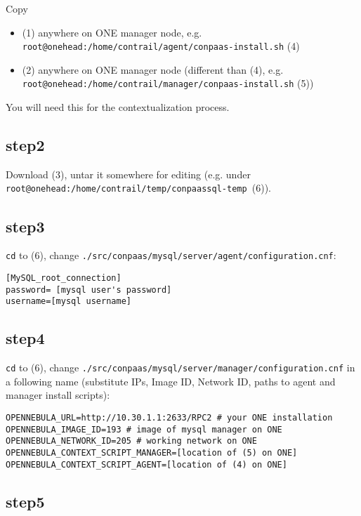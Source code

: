 \documentclass[a4paper,10pt]{article}
\begin{document}
Copy
\begin{itemize}
\item (1) anywhere on ONE manager node, e.g. \\ {\tt root@onehead:/home/contrail/agent/conpaas-install.sh} (4)
\item (2) anywhere on ONE manager node (different than (4), e.g. \\ {\tt root@onehead:/home/contrail/manager/conpaas-install.sh} (5))
\end{itemize}

You will need this for the contextualization process.

\subsection*{step2} 

Download (3), untar it somewhere for editing (e.g. under \\ {\tt root@onehead:/home/contrail/temp/conpaassql-temp }(6)).

\subsection*{step3}

{\tt cd} to (6), change {\tt ./src/conpaas/mysql/server/agent/configuration.cnf}:

\begin{Verbatim}[frame=single]
[MySQL_root_connection]
password= [mysql user's password]
username=[mysql username]
\end{Verbatim}

\subsection*{step4}

{\tt cd} to (6), change {\tt ./src/conpaas/mysql/server/manager/configuration.cnf} in a following name (substitute IPs, Image ID, Network ID, paths to agent and manager install scripts):

\begin{Verbatim}[frame=single]
OPENNEBULA_URL=http://10.30.1.1:2633/RPC2 # your ONE installation
OPENNEBULA_IMAGE_ID=193 # image of mysql manager on ONE
OPENNEBULA_NETWORK_ID=205 # working network on ONE
OPENNEBULA_CONTEXT_SCRIPT_MANAGER=[location of (5) on ONE]
OPENNEBULA_CONTEXT_SCRIPT_AGENT=[location of (4) on ONE]
\end{Verbatim}

\subsection*{step5}
\end{document}
